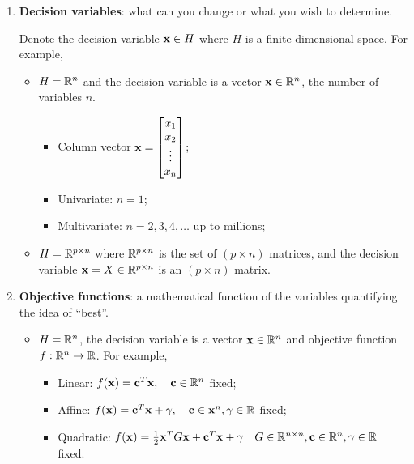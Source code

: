 \begin{enumerate}[label=(\arabic*)]
    \item \textbf{Decision variables}: what can you change or what  you wish to determine.

          Denote the decision variable \(\mathbf{x} \in H\) where \(H\) is a finite dimensional space. For example,
          \begin{itemize}
              \item \(H = \mathbb{R}^n\) and the decision variable is a vector \(\mathbf{x} \in \mathbb{R}^n\), the number of variables \(n\).
                    \begin{itemize}
                        \item Column vector \(\mathbf{x} = \begin{bmatrix} x_1 \\ x_2 \\ \vdots \\ x_n\end{bmatrix}\);
                        \item Univariate: \(n = 1\);
                        \item Multivariate: \(n = 2, 3, 4, \dots\) up to millions;
                    \end{itemize}
              \item \(H = \mathbb{R}^{p \times n}\) where \(\mathbb{R}^{p \times n}\) is the set of \((p \times n)\) matrices, and the decision variable \(\mathbf{x} = X \in \mathbb{R}^{p \times n}\) is an \((p \times n)\) matrix.
          \end{itemize}
    \item \textbf{Objective functions}: a mathematical function of the variables quantifying the idea of ``best''.
          \begin{itemize}
              \item \(H = \mathbb{R}^n\), the decision variable is a vector \(\mathbf{x} \in \mathbb{R}^n\) and objective function \(f: \mathbb{R}^n \to \mathbb{R}\). For example,
                    \begin{itemize}
                        \item Linear: \(f(\mathbf{x}) = \mathbf{c}^T \mathbf{x}, \quad \mathbf{c} \in \mathbb{R}^n\) fixed;
                        \item Affine: \(f(\mathbf{x}) = \mathbf{c}^T \mathbf{x} + \gamma, \quad \mathbf{c} \in \mathbf{x}^n, \gamma \in \mathbb{R}\) fixed;
                        \item Quadratic: \(f(\mathbf{x}) = \frac{1}{2}\mathbf{x}^T G\mathbf{x} + \mathbf{c}^T \mathbf{x} + \gamma \quad G \in \mathbb{R}^{n \times n}, \mathbf{c} \in \mathbb{R}^n, \gamma \in \mathbb{R}\) fixed.
                    \end{itemize}

\end{itemize}
\end{enumerate}

